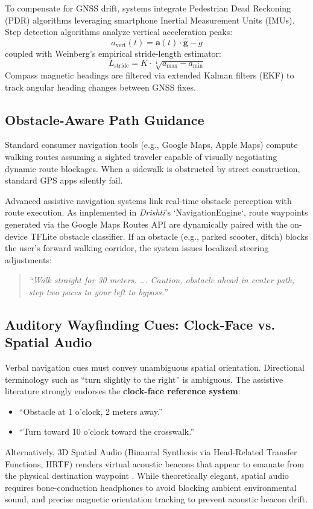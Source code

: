 \documentclass[10pt,twocolumn]{article}
\begin{document}
To compensate for GNSS drift, systems integrate Pedestrian Dead Reckoning (PDR) algorithms leveraging smartphone Inertial Measurement Units (IMUs). Step detection algorithms analyze vertical acceleration peaks:
\begin{equation}
    a_{\text{vert}}(t) = \mathbf{a}(t) \cdot \hat{\mathbf{g}} - g
\end{equation}
coupled with Weinberg's empirical stride-length estimator:
\begin{equation}
    L_{\text{stride}} = K \cdot \sqrt[4]{a_{\text{max}} - a_{\text{min}}}
\end{equation}
Compass magnetic headings are filtered via extended Kalman filters (EKF) to track angular heading changes between GNSS fixes.

\subsection{Obstacle-Aware Path Guidance}
Standard consumer navigation tools (e.g., Google Maps, Apple Maps) compute walking routes assuming a sighted traveler capable of visually negotiating dynamic route blockages. When a sidewalk is obstructed by street construction, standard GPS apps silently fail.

Advanced assistive navigation systems link real-time obstacle perception with route execution. As implemented in \textit{Drishti}'s `NavigationEngine`, route waypoints generated via the Google Maps Routes API are dynamically paired with the on-device TFLite obstacle classifier. If an obstacle (e.g., parked scooter, ditch) blocks the user's forward walking corridor, the system issues localized steering adjustments:
\begin{quote}
    \textit{``Walk straight for 30 meters. ... Caution, obstacle ahead in center path; step two paces to your left to bypass.''}
\end{quote}

\subsection{Auditory Wayfinding Cues: Clock-Face vs. Spatial Audio}
Verbal navigation cues must convey unambiguous spatial orientation. Directional terminology such as ``turn slightly to the right'' is ambiguous. The assistive literature strongly endorses the \textbf{clock-face reference system}:
\begin{itemize}[leftmargin=*]
    \item ``Obstacle at 1 o'clock, 2 meters away.''
    \item ``Turn toward 10 o'clock toward the crosswalk.''
\end{itemize}
Alternatively, 3D Spatial Audio (Binaural Synthesis via Head-Related Transfer Functions, HRTF) renders virtual acoustic beacons that appear to emanate from the physical destination waypoint \cite{katz2012navigating}. While theoretically elegant, spatial audio requires bone-conduction headphones to avoid blocking ambient environmental sound, and precise magnetic orientation tracking to prevent acoustic beacon drift.
\end{document}
